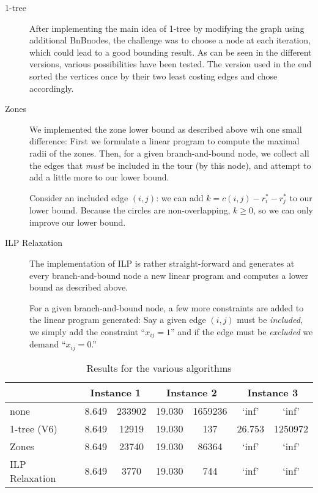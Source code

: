 \documentclass{article}
\begin{document}

\begin{description}
\item[1-tree] After implementing the main idea of 1-tree by modifying the graph using additional BnBnodes, the challenge was to choose a node at each iteration, which could lead to a good bounding result. As can be seen in the different versions, various possibilities have been tested. The version used in the end sorted the vertices once by their two least costing edges and chose accordingly.
\item[Zones] We implemented the zone lower bound as described above
  wih one small difference: First we formulate a linear program to
  compute the maximal radii of the zones. Then, for a given
  branch-and-bound node, we collect all the edges that \emph{must} be
  included in the tour (by this node), and attempt to add a little
  more to our lower bound.

  Consider an included edge $(i,j)$: we can add $k = c(i,j) - r_i^* -
  r_j^*$ to our lower bound. Because the circles are non-overlapping,
  $k \geq 0$, so we can only improve our lower bound.
\item[ILP Relaxation] The implementation of ILP is rather
  straight-forward and generates at every branch-and-bound node a new
  linear program and computes a lower bound as described above.

  For a given branch-and-bound node, a few more constraints are added
  to the linear program generated: Say a given edge $(i,j)$ must be
  \emph{included}, we simply add the constraint ``$x_{ij} = 1$'' and if
  the edge must be \emph{excluded} we demand ``$x_{ij} = 0$.''
\end{description}

\begin{table}[h!]
  \centering
  \begin{tabular}{l|c|c|c|c|c|c}
    & \multicolumn{2}{c|}{Instance 1} & \multicolumn{2}{|c|}{Instance 2} & \multicolumn{2}{|c}{Instance 3} \\\hline
    none & 8.649 & 233902 &  19.030 & 1659236 & `inf' & `inf' \\ 
    1-tree (V6) & 8.649 & 12919 &  19.030 & 137 & 26.753 & 1250972 \\ 
    Zones & 8.649 & 23740 & 19.030 & 86364 & `inf' & `inf' \\
    ILP Relaxation & 8.649 & 3770 & 19.030 & 744 & `inf' & `inf' \\
  \end{tabular}
  \caption{Results for the various algorithms}
  \label{tab:results}
\end{table}
\end{document}
